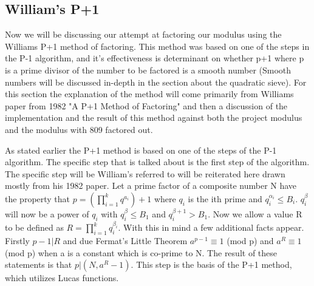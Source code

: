 \documentclass[12pt]{article} %
\begin{document}
\subsection{William's P+1}
Now we will be discussing our attempt at factoring our modulus using the Williams P+1 method of factoring. This method was based on one of the steps in the P-1 algorithm, and it's effectiveness is determinant on whether p+1 where p is a prime divisor of the number to be factored is a smooth number (Smooth numbers will be discussed in-depth in the section about the quadratic sieve). For this section the explanation of the method will come primarily from Williams paper from 1982 "A P+1 Method of Factoring" and then a discussion of the implementation and the result of this method against both the project modulus and the modulus with 809 factored out.

\indent As stated earlier the P+1 method is based on one of the steps of the P-1 algorithm. The specific step that is talked about is the first step of the algorithm. The specific step will be William's referred to will be reiterated here drawn mostly from his 1982 paper. Let a prime factor of a composite number N have the property that $p = (\prod^{k}_{i=1}q^{a_i})+1$ where $q_i$ is the ith prime and $q^{\alpha_i}_i\leq B_i$. $q^{\beta}_i$ will now be a power of $q_i$  with $q^{\beta}_i \leq B_1$ and $q^{\beta+1}_i > B_1$. Now we allow a value R to be defined as $R= \prod^{k}_{i=1}q^{\beta _i}_i$. With this in mind a few additional facts appear. Firstly $p-1|R$ and due Fermat's Little Theorem  $a^{p-1} \equiv 1$ (mod p) and $a^{R} \equiv 1$ (mod p) when a is a constant which is co-prime to N. The result of these statements is that $p|(N,a^{R}-1)$. This step is the basis of the P+1 method, which utilizes Lucas functions.
\end{document}
